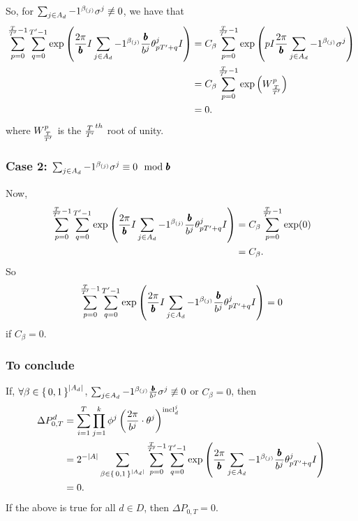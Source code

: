 So, for $\sum_{j \in A_d} -1 ^ {\beta_{(j)}} \sigma^j \not\equiv 0$, we have that
\begin{align*}
  \sum_{p= 0}^{\frac{T}{{T}'} - 1} \sum_{q = 0}^{{T}' - 1} \exp\left( \frac{2\pi}{{\pmb{b}}} I \sum_{j \in A_d} -1 ^ {\beta_{(j)}} \frac{{\pmb{b}}}{b^j} {\theta^j_{p {T}' + q}}I \right) &= C_\beta \sum_{p= 0}^{\frac{T}{{T}'} - 1}
    \exp\left(
      pI \frac{2\pi}{{\pmb{b}}} \sum_{j \in A_d} -1 ^ {\beta_{(j)}}
      \sigma^j
    \right) \\
    &= C_\beta \sum_{p = 0}^{\frac{T}{{T}'} - 1}\exp\left(W_{\frac{T}{{T}'}}^p\right) \\
    &= 0.
\end{align*}
where $W_{\frac{T}{{T}'}}^p$ is the $\frac{T}{{T}'}^{th}$ root of unity.

\subsubsection*{Case 2: $\sum_{j \in A_d} -1 ^ {\beta_{(j)}} \sigma^j \equiv 0 \mod {{\pmb{b}}}$}
Now,
\begin{align*}
  \sum_{p= 0}^{\frac{T}{{T}'} - 1} \sum_{q = 0}^{{T}' - 1} \exp\left( \frac{2\pi}{{\pmb{b}}} I \sum_{j \in A_d} -1 ^ {\beta_{(j)}} \frac{{\pmb{b}}}{b^j} {\theta^j_{p {T}' + q}}I \right) &= C_\beta \sum_{p= 0}^{\frac{T}{{T}'} - 1} \exp(0) \\
  &= C_\beta.
\end{align*}
So $$\sum_{p= 0}^{\frac{T}{{T}'} - 1} \sum_{q = 0}^{{T}' - 1} \exp\left( \frac{2\pi}{{\pmb{b}}} I \sum_{j \in A_d} -1 ^ {\beta_{(j)}} \frac{{\pmb{b}}}{b^j} {\theta^j_{p {T}' + q}}I \right) = 0$$ if $C_\beta = 0$.

\subsubsection*{To conclude}
If, $\forall \beta \in \set{0, 1}^{|A_d|}$, $\sum_{j \in A_d} -1 ^ {\beta_{(j)}} \frac{{\pmb{b}}}{b^j} \sigma^j \not\equiv 0$
or $C_\beta = 0$, then
\begin{align*}
  \Delta P_{0, T}^d &= \sum_{i = 1}^T \prod_{j=1}^k \phi^j\left(\frac{2\pi}{b^j} \cdot \theta^j\right) ^ {{\mathrm{incl}_{d}^{j}}} \\&=  2^{-|A|}
  \sum_{\beta \in \set{0,1}^{|A_d|}} 
      \sum_{p= 0}^{\frac{T}{{T}'} - 1} \sum_{q = 0}^{{T}' - 1}
     \exp\left(
       \frac{2\pi}{{\pmb{b}}}
         \sum_{j \in A_d} -1 ^ {\beta_{(j)}}
         \frac{{\pmb{b}}}{b^j}
         {\theta^j_{p {T}' + q}}I
       \right) \\
        &= 0.
\end{align*}
If the above is true for all $d \in D$, then 
$\Delta P_{0, T} = 0$.

